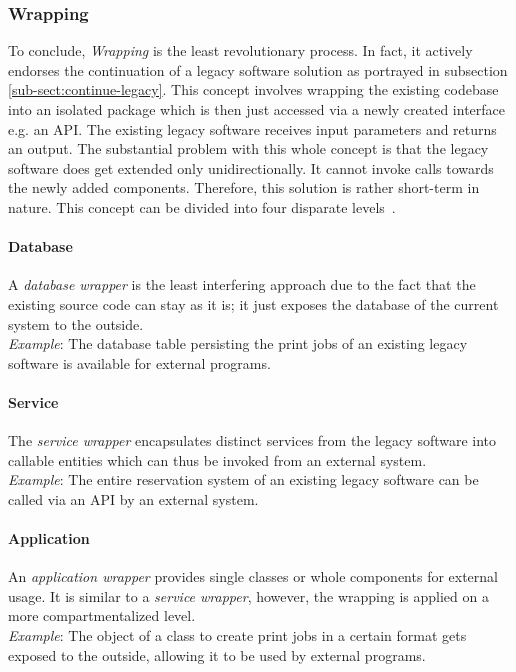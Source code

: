 \documentclass[12pt,a4paper,twoside]{report}
\begin{document}
\subsubsection{Wrapping}

To conclude, \textit{Wrapping} is the least revolutionary process.
In fact, it actively endorses the continuation of a legacy software solution as
portrayed in subsection \ref{sub-sect:continue-legacy}.
This concept involves wrapping the existing codebase into an isolated package
which is then just accessed via a newly created interface e.g. an API.
The existing legacy software receives input parameters and returns an output.
The substantial problem with this whole concept is that the legacy software does get
extended only unidirectionally. It cannot invoke calls towards the newly added components.
Therefore, this solution is rather short-term in nature.
This concept can be divided into four disparate levels~\cite{sneed-encapsulating-legacy}.

\paragraph{Database}
A \textit{database wrapper} is the least interfering approach due to the fact that
the existing source code can stay as it is; it just exposes the database of the current system
to the outside.\\
\textit{Example}: The database table persisting the print jobs of an existing legacy software
is available for external programs.

\paragraph{Service}
The \textit{service wrapper} encapsulates distinct services from the legacy software
into callable entities which can thus be invoked from an external system.\\
\textit{Example}: The entire reservation system of an existing legacy software
can be called via an API by an external system.

\paragraph{Application}
An \textit{application wrapper} provides single classes or whole components for external usage.
It is similar to a \textit{service wrapper}, however, the wrapping is applied on a more
compartmentalized level.\\
\textit{Example}: The object of a class to create print jobs in a certain format
gets exposed to the outside, allowing it to be used by external programs.
\end{document}
